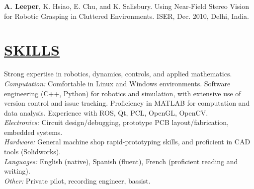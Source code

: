 \documentclass[line,margin]{res}
\newcommand{\CVOnly}[1]{}
\newcommand{\CVOnlySmall}[1]{{\small \CVOnly{#1}}}
\newcommand{\BothSmall}[1]{{\small #1}}   }
\newcommand{\CVOnly}[1]{#1}
\newcommand{\CVOnlySmall}[1]{{\CVOnly{#1}}}
\newcommand{\BothSmall}[1]{{#1}}    }
\newcommand{\boldName}[1]{\textbf{#1}}
\begin{document}
\begin{resume}
%
\CVOnlySmall{R. Brewer, \boldName{A. Leeper}, K. Salisbury. A Friction Differential and Cable Transmission Design for a 3-DOF Haptic Device with Spherical Kinematics. IROS, Sept. 2011, San Francisco, CA. \\[0.4pc]}
%
\CVOnlySmall{D. Gossow, \boldName{A. Leeper}, D. Hershberger, M. Ciocarlie. Interactive Markers: 3-D User Interfaces for ROS Applications [ROS Topics]. IEEE Robotics and Automation Magazine, December 2011. \\[0.4pc]}
%
\CVOnlySmall{\boldName{A. Leeper}, S. Chan, and K. Salisbury. Constraint-based 3-DOF Haptic Rendering of Arbitrary Point Cloud Data. RSS Workshop on RGB-D Cameras, June 2011, Los Angeles, CA. \\[0.4pc]}
%
\BothSmall{\boldName{A. Leeper}, K. Hsiao, E. Chu, and K. Salisbury. Using Near-Field Stereo Vision for Robotic Grasping in Cluttered Environments. ISER, Dec. 2010, Delhi, India.  \CVOnlySmall{\\[0.4pc]} }
%
\CVOnlySmall{Caruso, John F; Hari, P; \boldName{Leeper, Adam E}; Coday, Michael A; Monda, Julie K; Ramey, Elizabeth S; Hastings, Lori P; Golden, Mallory R; Davison, Steve W. Impact of Acceleration on Blood Lactate Values Derived From High-Speed Resistance Exercise. Journal of Strength \& Conditioning Research. 23(7):2009-2014, October 2009.  \\[0.4pc]}
%
\CVOnlySmall{Caruso J.F., Hari P., Coday M.A., \boldName{Leeper A.}, Ramey E.S., Monda J.K., Hastings L.P., and Davison S. (2008). Performance evaluation of a high-speed inertial exercise trainer. The Journal of Strength \& Conditioning Research. 22(6): 1760-1768. \\[0.4pc]}
%
\CVOnlySmall{\boldName{A. Leeper}, M. Coday, P. Hari, J. Caruso. Instrumentation of a High-Speed Inertial Exercise Device Using Load Cell Transducers. Proceedings of 53rd IIS, April 2007, Tulsa, OK.}
%
%
\section{\underline{SKILLS}}
\vspace{1.0pc}Strong expertise in robotics, dynamics, controls, and applied mathematics.
\\[0.25pc] {\sl Computation: }
Comfortable in Linux and Windows environments.
Software engineering (C++, Python) for robotics and simulation, with extensive use of version control and issue tracking. 
Proficiency in MATLAB for computation and data analysis.
Experience with ROS, Qt, PCL, OpenGL, OpenCV. 
\\[0.25pc]{\sl Electronics: } Circuit design/debugging, prototype PCB layout/fabrication, embedded systems.  
\\[0.25pc]{\sl Hardware: } General machine shop rapid-prototyping skills, and proficient in CAD tools (Solidworks). 
\\[0.25pc]{\sl Languages: } English (native), Spanish (fluent), French (proficient reading and writing). 
\\[0.25 		pc]{\sl Other: } Private pilot, recording engineer, bassist.    
%
%
\CVOnly{
}
\end{resume}
\end{document}

